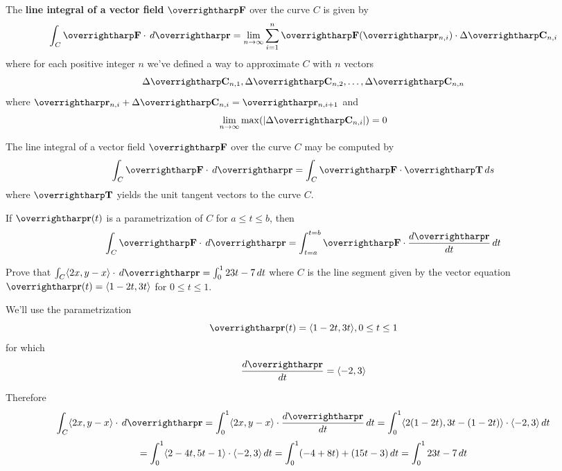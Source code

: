 \documentclass[letterpaper, twoside, 12pt]{book}
\begin{document}
\begin{definition}
The \textbf{line integral of a vector field} $\vect F$
over the curve $C$ is given by
  \[
    \int_C \vect F\cdot\dvar{\vect r} =
    \lim_{n\to\infty}\sum_{i=1}^n
    \vect F(\vect{r}_{n,i})\cdot\Delta\vect{C}_{n,i}
  \]
where for each positive integer $n$ we've defined a way to approximate $C$
with $n$ vectors
  \[
    \Delta \vect{C}_{n,1},\Delta \vect{C}_{n,2},\dots,\Delta \vect{C}_{n,n}
  \]
where $\vect{r}_{n,i}+\Delta \vect{C}_{n,i}=\vect{r}_{n,i+1}$
and
  \[
    \lim_{n\to\infty} \max(|\Delta \vect{C}_{n,i}|) = 0
  \]
\end{definition}

\begin{definition}
The line integral of a vector field $\vect F$ over the curve $C$
may be computed by
    \[
      \int_C \vect{F}\cdot\dvar{\vect r}
        =
      \int_C \vect{F}\cdot\vect{T}\dvar{s}
    \]
where $\vect T$ yields the unit tangent vectors to the curve $C$.
\end{definition}

\begin{definition}
If $\vect{r}(t)$ is a parametrization of $C$ for $a \leq t \leq b$, then
    \[
      \int_C \vect{F}\cdot\dvar{\vect r}
        =
      \int_{t=a}^{t=b} \vect{F}\cdot\frac{d\vect{r}}{dt}\dvar{t}
    \]
\end{definition}

          \begin{problem}
            Prove that
            $\int_C \<2x,y-x\>\cdot\dvar{\vect{r}}
              =
            \int_0^1 23t-7 \dvar{t}$
            where $C$ is the line segment given by the vector equation
            $\vect{r}(t)=\<1-2t,3t\>$ for $0\leq t\leq 1$.
          \end{problem}

          \begin{solution}
            We'll use the parametrization
              \[
                \vect{r}(t)
                  =
                \<1-2t,3t\>,
                0\leq t\leq 1
              \]
            for which
              \[
                \frac{d\vect{r}}{dt}
                  =
                \<-2,3\>
              \]

            Therefore
              \[
                \int_C \<2x,y-x\>\cdot\dvar{\vect{r}}
                  =
                \int_0^1 \<2x,y-x\>\cdot\frac{d\vect{r}}{dt}\dvar{t}
                  =
                \int_0^1 \<2(1-2t),3t-(1-2t)\>\cdot\<-2,3\>\dvar{t}
              \]
              \[
                  =
                \int_0^1 \langle2-4t,5t-1\rangle\cdot\langle-2,3\rangle\,d{t}
                  =
                \int_0^1 (-4+8t)+(15t-3)\,d{t}
                  =
                \int_0^1 23t-7\,d{t}
              \]
          \end{solution}
\end{document}

